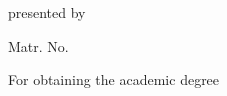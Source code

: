 
\begin{titlepage}

\sffamily

\vspace*{3cm}
\fontsize{24pt}{26pt}\selectfont
\begin{center}
\textbf{\documentType}

\large
\myCourseOfStudy
\vspace*{3cm}

\Large
\textbf{\myTitle}
\vspace*{1.8cm}

\normalsize
presented by

\myName

Matr. No. \myMatriculationNumber \\
\vspace*{1.2cm}

For obtaining the academic degree\\
\vspace*{0.4cm}
\intention\\
\vspace*{1.5cm}

\ifdefempty{\Restriction}{\textbf{\underline{\Restriction}}}{}
\end{center}
\vspace*{1cm}
\normalsize



\end{titlepage}
